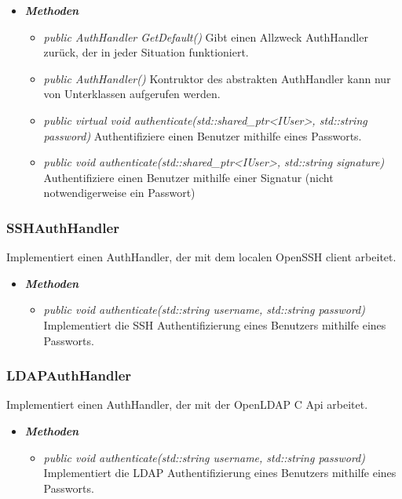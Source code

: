 \documentclass[a4paper,12pt]{article}
\begin{document}
	\begin{itemize}[label={}]

	\item\textit{\textbf{Methoden}}
		\begin{itemize}[label={\textbullet}]
			\item\textit{public AuthHandler GetDefault()} Gibt einen Allzweck AuthHandler zurück, der in jeder Situation funktioniert.
			\item\textit{public AuthHandler()} Kontruktor des abstrakten AuthHandler kann nur von Unterklassen aufgerufen werden.
			\item\textit{public virtual void authenticate(std::shared\_ptr<IUser>, std::string password)} Authentifiziere einen Benutzer mithilfe eines Passworts.
			\item\textit{public void authenticate(std::shared\_ptr<IUser>, std::string signature)} Authentifiziere einen Benutzer mithilfe einer Signatur (nicht notwendigerweise ein Passwort)
			
		\end{itemize}

\end{itemize}


\subsubsection{SSHAuthHandler}

Implementiert einen AuthHandler, der mit dem localen OpenSSH client arbeitet.

	\begin{itemize}[label={}]

	\item\textit{\textbf{Methoden}}
		\begin{itemize}[label={\textbullet}]
			\item\textit{public void authenticate(std::string username, std::string password)} Implementiert die SSH Authentifizierung eines Benutzers mithilfe eines Passworts.
		\end{itemize}

\end{itemize}


\subsubsection{LDAPAuthHandler}

Implementiert einen AuthHandler, der mit der OpenLDAP C Api arbeitet.

	\begin{itemize}[label={}]

	\item\textit{\textbf{Methoden}}
		\begin{itemize}[label={\textbullet}]
			\item\textit{public void authenticate(std::string username, std::string password)} Implementiert die LDAP Authentifizierung eines Benutzers mithilfe eines Passworts.
		\end{itemize}

\end{itemize}
\end{document}
